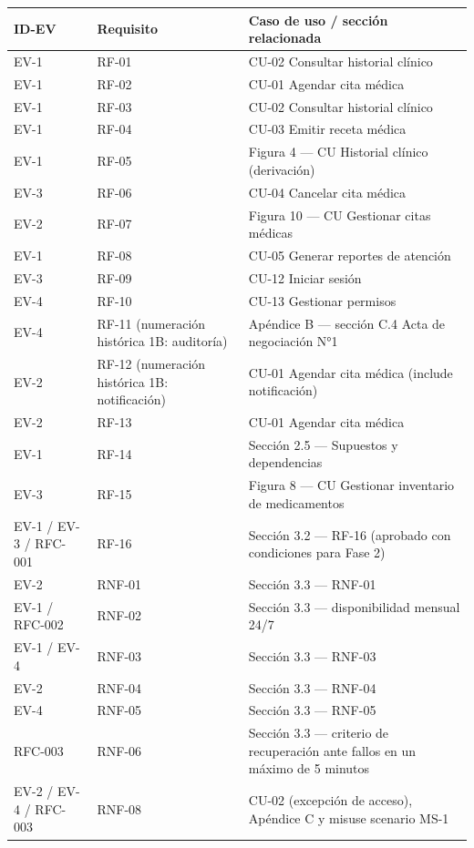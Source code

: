 \documentclass[11pt,a4paper]{article}
\begin{document}
	\begin{longtable}{p{} p{} p{}}
		
		\toprule
		\textbf{ID-EV} &
		\textbf{Requisito} &
		\textbf{Caso de uso / sección relacionada} \\
		\midrule
		\endhead
		
		\bottomrule
		\endlastfoot
		EV-1 & RF-01 & CU-02 Consultar historial clínico \\
		EV-1 & RF-02 & CU-01 Agendar cita médica \\
		EV-1 & RF-03 & CU-02 Consultar historial clínico \\
		EV-1 & RF-04 & CU-03 Emitir receta médica \\
		EV-1 & RF-05 & Figura 4 --- CU Historial clínico (derivación) \\
		EV-3 & RF-06 & CU-04 Cancelar cita médica \\
		EV-2 & RF-07 & Figura 10 --- CU Gestionar citas médicas \\
		EV-1 & RF-08 & CU-05 Generar reportes de atención \\
		EV-3 & RF-09 & CU-12 Iniciar sesión \\
		EV-4 & RF-10 & CU-13 Gestionar permisos \\
		EV-4 & RF-11 (numeración histórica 1B: auditoría) & Apéndice B --- sección C.4 Acta de negociación N°1 \\
		EV-2 & RF-12 (numeración histórica 1B: notificación) & CU-01 Agendar cita médica (include notificación) \\
		EV-2 & RF-13 & CU-01 Agendar cita médica \\
		EV-1 & RF-14 & Sección 2.5 --- Supuestos y dependencias \\
		EV-3 & RF-15 & Figura 8 --- CU Gestionar inventario de medicamentos \\
		EV-1 / EV-3 / RFC-001 & RF-16 & Sección 3.2 --- RF-16 (aprobado con condiciones para Fase 2) \\
		EV-2 & RNF-01 & Sección 3.3 --- RNF-01 \\
		EV-1 / RFC-002 & RNF-02 & Sección 3.3 --- disponibilidad mensual 24/7 \\
		EV-1 / EV-4 & RNF-03 & Sección 3.3 --- RNF-03 \\
		EV-2 & RNF-04 & Sección 3.3 --- RNF-04 \\
		EV-4 & RNF-05 & Sección 3.3 --- RNF-05 \\
		RFC-003 & RNF-06 & Sección 3.3 --- criterio de recuperación ante fallos en un máximo de 5 minutos \\
		EV-2 / EV-4 / RFC-003 & RNF-08 & CU-02 (excepción de acceso), Apéndice C y misuse scenario MS-1 \\
	\end{longtable}
	
\end{document}
